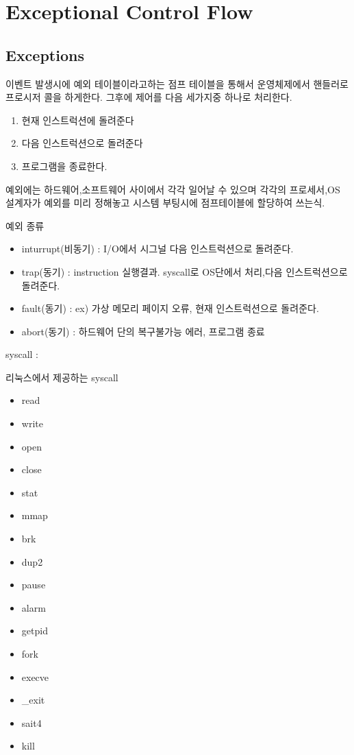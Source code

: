 
\chapter{Exceptional Control Flow}

\section{Exceptions}

이벤트 발생시에 예외 테이블이라고하는 점프 테이블을 통해서 운영체제에서 핸들러로 프로시저 콜을 하게한다.
그후에 제어를 다음 세가지중 하나로 처리한다.

\begin{enumerate}
    \item 현재 인스트럭션에 돌려준다
    \item 다음 인스트럭션으로 돌려준다 
    \item 프로그램을 종료한다.
\end{enumerate}

예외에는 하드웨어,소프트웨어 사이에서 각각 일어날 수 있으며 각각의 프로세서,OS 설계자가 예외를 미리 정해놓고 시스템 부팅시에 점프테이블에 할당하여 쓰는식.

예외 종류
\begin{itemize}
    \item inturrupt(비동기) : I/O에서 시그널  다음 인스트럭션으로 돌려준다.
    \item trap(동기) : instruction 실행결과. syscall로 OS단에서 처리,다음 인스트럭션으로 돌려준다.
    \item fault(동기) : ex) 가상 메모리 페이지 오류, 현재 인스트럭션으로 돌려준다.
    \item abort(동기) : 하드웨어 단의 복구불가능 에러, 프로그램 종료
\end{itemize}

syscall : 

리눅스에서 제공하는 syscall
\begin{itemize}
    \item read
    \item write
    \item open
    \item close
    \item stat
    \item mmap
    \item brk
    \item dup2
    \item pause
    \item alarm
    \item getpid
    \item fork
    \item execve
    \item \_exit
    \item sait4
    \item kill
\end{itemize}

